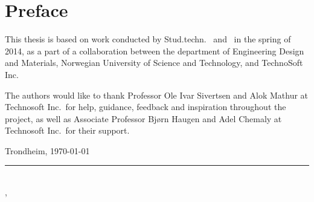 \section*{\Huge Preface}
\vspace{1 cm}


\noindent This thesis is based on work conducted by Stud.techn. \myauthorA\ and \myauthorB\ in the spring of 2014, as a part of a collaboration between the department of Engineering Design and Materials, Norwegian University of Science and Technology, and TechnoSoft Inc.

\noindent The authors would like to thank Professor Ole Ivar Sivertsen and Alok Mathur at Technosoft Inc.\ for help, guidance, feedback and inspiration throughout the project, as well as Associate Professor Bjørn Haugen and Adel Chemaly at Technosoft Inc.\ for their support.



Trondheim, \today


\rule{10cm}{0.5pt}\\
\indent \myauthorA, \myauthorB\

\cleardoublepage\

